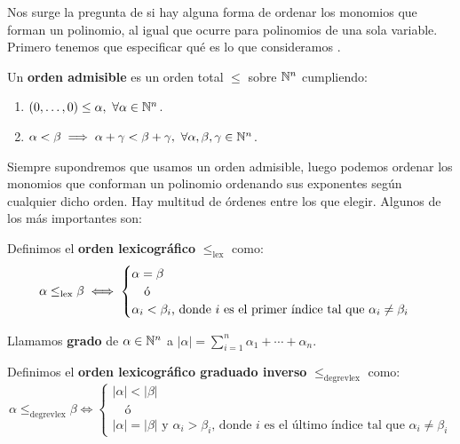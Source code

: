 Nos surge la pregunta de si hay alguna forma  de ordenar los monomios que forman un polinomio, al igual que ocurre para polinomios de una sola variable. Primero tenemos que especificar qué es lo que consideramos .

\begin{definicion}
    Un \textbf{orden admisible} es un orden total $\le$ sobre $\mathbb{N}^n$ cumpliendo:
    \begin{enumerate}
        \item $(0,\dots ,0) \le \alpha,\ \forall \alpha \in \mathbb{N}^n$.
        \item $\alpha < \beta \implies \alpha + \gamma < \beta + \gamma,\ \forall \alpha,\beta,\gamma \in \mathbb{N}^n$.
    \end{enumerate}
\end{definicion}

Siempre supondremos que usamos un orden admisible, luego podemos ordenar los monomios que conforman un polinomio ordenando sus exponentes según cualquier dicho orden. Hay multitud de órdenes entre los que elegir. Algunos de los más importantes son:

\begin{ejemplo}
    Definimos el \textbf{orden lexicográfico} $\le_{\text{lex}}$ como:
    \begin{equation*}
        \alpha \le_{\text{lex}} \beta \iff \begin{cases}
            \alpha  = \beta \\
            \quad\text{ó}   \\
            \alpha_i < \beta_i \text{, donde $i$ es el primer índice tal que } \alpha_i \neq \beta_i
        \end{cases}
    \end{equation*}
\end{ejemplo}

\begin{definicion}
    Llamamos \textbf{grado} de $\alpha\in\mathbb{N}^n$ a $\vert \alpha\vert = \sum_{i=1}^n \alpha_1+\cdots + \alpha_n$.
\end{definicion}
\begin{ejemplo}
    Definimos el \textbf{orden lexicográfico graduado inverso} $\le_{\text{degrevlex}}$ como:
    \begin{equation*}
        \alpha \le_{\text{degrevlex}} \beta \iff \begin{cases}
            |\alpha| < |\beta| \\
            \quad\text{ó}   \\
            |\alpha| = |\beta| \text{ y } \alpha_i > \beta_i \text{, donde $i$ es el último índice tal que } \alpha_i \neq \beta_i
        \end{cases}
    \end{equation*}
\end{ejemplo}

